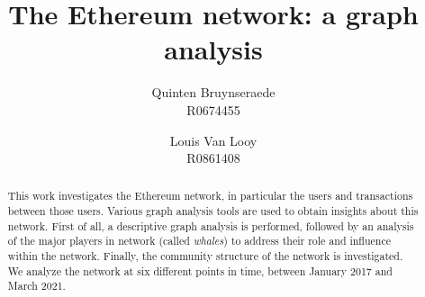 \documentclass[10pt,a4paper]{article}
\author{Quinten Bruynseraede  \\ R0674455 \and Louis Van Looy \\ R0861408}
\title{The Ethereum network: a graph analysis}
\begin{document}
\maketitle

\begin{abstract}
	
This work investigates the Ethereum network, in particular the users and transactions between those users. Various graph analysis tools are used to obtain insights about this network. First of all, a descriptive graph analysis is performed, followed by an analysis of the major players in network (called \textit {whales}) to address their role and influence within the network. Finally, the community structure of the network is investigated. We analyze the network at six different points in time, between January 2017 and March 2021. 

\end{abstract}
\end{document}
